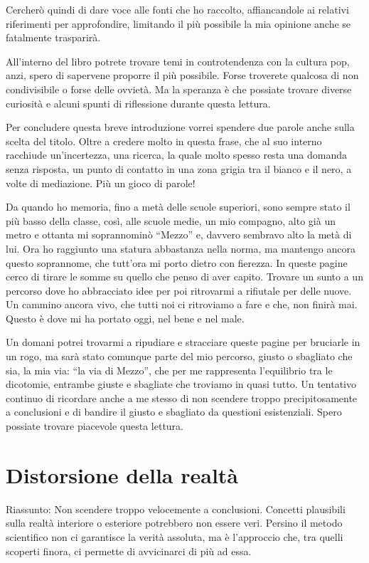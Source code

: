 \documentclass[12pt]{book} %
\begin{document}
Cercherò quindi di dare voce alle fonti che ho raccolto, affiancandole ai relativi riferimenti per approfondire,
limitando il più possibile la mia opinione anche se fatalmente trasparirà.

All'interno del libro potrete trovare temi in controtendenza con la cultura pop, anzi, spero di
sapervene proporre il più possibile. Forse troverete qualcosa di non condivisibile o forse delle ovvietà. Ma la
speranza è che possiate trovare diverse curiosità e alcuni spunti di riflessione durante questa lettura.

Per concludere questa breve introduzione vorrei spendere due parole anche sulla scelta del titolo. Oltre a credere molto
in questa frase, che al suo interno racchiude un'incertezza, una ricerca, la quale molto spesso
resta una domanda senza risposta, un punto di contatto in una zona grigia tra il bianco e il nero, a volte di
mediazione. Più un gioco di parole!

Da quando ho memoria, fino a metà delle scuole superiori, sono sempre stato il più basso della classe, così, alle scuole
medie, un mio compagno, alto già un metro e ottanta mi soprannominò “Mezzo” e, davvero sembravo alto la metà di lui.
Ora ho raggiunto una statura abbastanza nella norma, ma mantengo ancora questo soprannome, che
tutt'ora mi porto dietro con fierezza. In queste pagine cerco di tirare le somme su quello che
penso di aver capito. Trovare un sunto a un percorso dove ho abbracciato idee per poi ritrovarmi a rifiutale per delle
nuove. Un cammino ancora vivo, che tutti noi ci ritroviamo a fare e che, non finirà mai. Questo è dove mi ha portato oggi, nel bene e nel male.

Un domani potrei trovarmi a ripudiare e stracciare queste pagine per bruciarle in un rogo, ma sarà stato comunque parte
del mio percorso, giusto o sbagliato che sia, la mia via: “la via di Mezzo”, che per me rappresenta l'equilibrio tra le dicotomie, entrambe giuste e sbagliate che troviamo in quasi tutto. Un tentativo continuo di ricordare anche a me stesso di non scendere troppo precipitosamente a conclusioni e di bandire il giusto e sbagliato da questioni esistenziali.
Spero possiate trovare piacevole questa lettura.

\clearpage\section{Distorsione della realtà}

\bigskip
\bigskip
\begin{mdframed}[linewidth=1pt]
Riassunto: Non scendere troppo velocemente a conclusioni. Concetti plausibili sulla realtà interiore o esteriore potrebbero non essere veri. Persino il metodo scientifico non ci garantisce la verità assoluta, ma è l'approccio che, tra quelli scoperti finora, ci permette di avvicinarci di più ad essa.
\end{mdframed}
\end{document}
